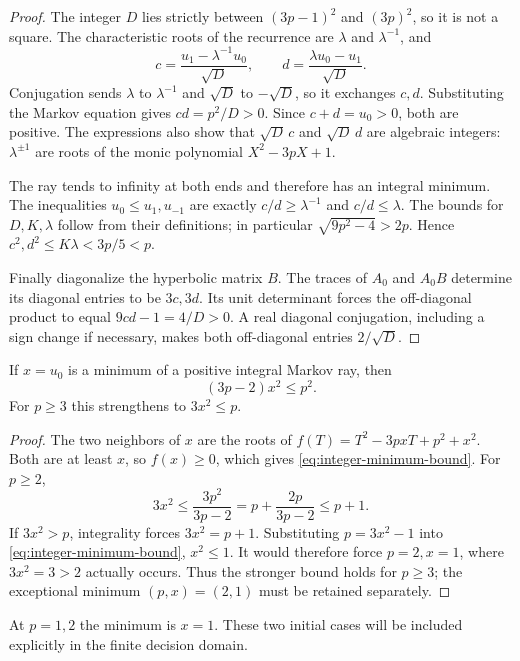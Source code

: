 \begin{proof}
The integer $D$ lies strictly between $(3p-1)^2$ and $(3p)^2$, so
it is not a square. The characteristic roots of the recurrence are
$\lambda$ and $\lambda^{-1}$, and
$$
 c=\frac{u_1-\lambda^{-1}u_0}{\sqrt D},\qquad
 d=\frac{\lambda u_0-u_1}{\sqrt D}.
$$
Conjugation sends $\lambda$ to $\lambda^{-1}$ and $\sqrt D$ to
$-\sqrt D$, so it exchanges $c,d$. Substituting the Markov equation
gives $cd=p^2/D>0$. Since $c+d=u_0>0$, both are positive. The
expressions also show that $\sqrt D\,c$ and $\sqrt D\,d$ are
algebraic integers: $\lambda^{\pm1}$ are roots of the monic
polynomial $X^2-3pX+1$.

The ray tends to infinity at both ends and therefore has an integral
minimum. The inequalities $u_0\leqslant u_1,u_{-1}$ are exactly
$c/d\geqslant\lambda^{-1}$ and $c/d\leqslant\lambda$.
The bounds for $D,K,\lambda$ follow from their definitions; in
particular $\sqrt{9p^2-4}>2p$. Hence
$c^2,d^2\leqslant K\lambda<3p/5<p$.

Finally diagonalize the hyperbolic matrix $B$. The traces of $A_0$
and $A_0B$ determine its diagonal entries to be $3c,3d$. Its
unit determinant forces the off-diagonal product to equal
$9cd-1=4/D>0$. A real diagonal conjugation, including a sign change
if necessary, makes both off-diagonal entries $2/\sqrt D$.
\end{proof}

\begin{lemma}\label{lem:integer-minimum}
If $x=u_0$ is a minimum of a positive integral Markov ray, then
\begin{equation}\label{eq:integer-minimum-bound}
 (3p-2)x^2\leqslant p^2.
\end{equation}
For $p\geqslant3$ this strengthens to $3x^2\leqslant p$.
\end{lemma}

\begin{proof}
The two neighbors of $x$ are the roots of
$f(T)=T^2-3pxT+p^2+x^2$. Both are at least $x$, so $f(x)\geqslant0$,
which gives \eqref{eq:integer-minimum-bound}. For $p\geqslant2$,
$$
 3x^2\leqslant\frac{3p^2}{3p-2}
 =p+\frac{2p}{3p-2}\leqslant p+1.
$$
If $3x^2>p$, integrality forces $3x^2=p+1$. Substituting $p=3x^2-1$ into
\eqref{eq:integer-minimum-bound}, $x^2\leqslant1$. It would therefore
force $p=2,x=1$, where $3x^2=3>2$ actually occurs. Thus the stronger
bound holds for $p\geqslant3$; the exceptional minimum $(p,x)=(2,1)$
must be retained separately.
\end{proof}

At $p=1,2$ the minimum is $x=1$. These two initial cases will be
included explicitly in the finite decision domain.
